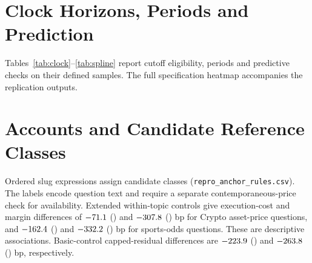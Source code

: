 \documentclass[sigconf,anonymous,nonacm,balance=false]{acmart}
\newcommand{\tabstyle}{\setlength{\tabcolsep}{3pt}}
\begin{document}
\section{Clock Horizons, Periods and Prediction}
\label{app:robust}
\label{app:infer}
\label{app:market}
Tables~\ref{tab:clock}--\ref{tab:spline} report cutoff eligibility, periods and predictive checks on their defined samples. The full specification heatmap accompanies the replication outputs.
\begin{table}[!tbp]
\centering
\caption{Clock residuals on each cutoff's common sample. Small-order difference: Politics minus Crypto at one hour. Probability bp; event-cluster SEs.}
\label{tab:clock}

\end{table}
\begin{table}[!htbp]
\centering
\caption{One-hour small-order residuals by resolution period and cutoff. Probability bp; event-cluster SEs.}
\label{tab:forward}
\tabstyle

\end{table}
\begin{table}[!htbp]
\centering
\caption{Expanding-window prediction, S common sample. Direction coefficients are logit coefficients multiplied by 10; Brier gains are $\times10^4$. Pooled intervals resample paired event losses.}
\label{tab:fwdpred}
\tabstyle

\end{table}

\begin{table}[!htbp]
\centering
\caption{Price calibration and flow on the separate 5,799-market spline sample. Knots: 0.2, 0.4, 0.6, 0.8. Brier losses and gains are multiplied by $10^4$; gains use linear-logit price as baseline. Forward training uses previously resolved markets.}
\label{tab:spline}
\tabstyle

\end{table}


\section{Accounts and Candidate Reference Classes}
\label{app:anchor}
Ordered slug expressions assign candidate classes (\nolinkurl{repro_anchor_rules.csv}). The labels encode question text and require a separate contemporaneous-price check for availability. Extended within-topic controls give execution-cost and margin differences of $-71.1$ (\EdAnchorCryCostSE) and $-307.8$ (\EdAnchorCryMarginSE) bp for Crypto asset-price questions, and $-162.4$ (\EdAnchorSportCostSE) and $-332.2$ (\EdAnchorSportMarginSE) bp for sports-odds questions. These are descriptive associations. Basic-control capped-residual differences are $-223.9$ (\EdAnchorCryResidualSE) and $-263.8$ (\EdAnchorSportResidualSE) bp, respectively.
\end{document}

